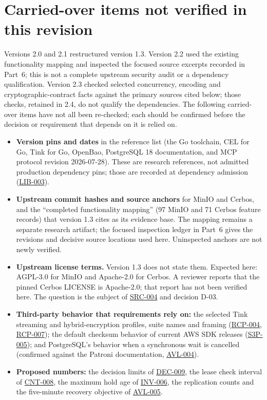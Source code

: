 \documentclass[11pt,a4paper]{article}
\newcommand{\rr}[1]{\hyperlink{req:#1}{#1}}
\begin{document}
\section{Carried-over items not verified in this revision}\label{app:unverified}
Versions 2.0 and 2.1 restructured version 1.3. Version 2.2 used the existing functionality mapping and inspected the focused source excerpts recorded in Part~6; this is not a complete upstream security audit or a dependency qualification. Version 2.3 checked selected concurrency, encoding and cryptographic-contract facts against the primary sources cited below; those checks, retained in 2.4, do not qualify the dependencies. The following carried-over items have not all been re-checked; each should be confirmed before the decision or requirement that depends on it is relied on.
\begin{itemize}
\item \textbf{Version pins and dates} in the reference list (the Go toolchain, CEL for Go, Tink for Go, OpenBao, PostgreSQL 18 documentation, and MCP protocol revision 2026-07-28). These are research references, not admitted production dependency pins; those are recorded at dependency admission (\rr{LIB-003}).
\item \textbf{Upstream commit hashes and source anchors} for MinIO and Cerbos, and the ``completed functionality mapping'' (97 MinIO and 71 Cerbos feature records) that version 1.3 cites as its evidence base. The mapping remains a separate research artifact; the focused inspection ledger in Part~6 gives the revisions and decisive source locations used here. Uninspected anchors are not newly verified.
\item \textbf{Upstream license terms.} Version 1.3 does not state them. Expected here: AGPL-3.0 for MinIO and Apache-2.0 for Cerbos. A reviewer reports that the pinned Cerbos LICENSE is Apache-2.0; that report has not been verified here. The question is the subject of \rr{SRC-004} and decision D-03.
\item \textbf{Third-party behavior that requirements rely on:} the selected Tink streaming and hybrid-encryption profiles, suite names and framing (\rr{RCP-004}, \rr{RCP-007}); the default checksum behavior of current AWS SDK releases (\rr{S3P-005}); and PostgreSQL's behavior when a synchronous wait is cancelled (confirmed against the Patroni documentation, \rr{AVL-004}).
\item \textbf{Proposed numbers:} the decision limits of \rr{DEC-009}, the lease check interval of \rr{CNT-008}, the maximum hold age of \rr{INV-006}, the replication counts and the five-minute recovery objective of \rr{AVL-005}.
\end{itemize}
\end{document}
